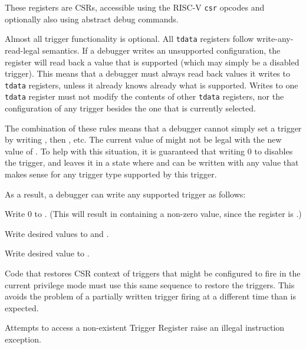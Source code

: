 These registers are CSRs, accessible using the RISC-V {\tt csr} opcodes and
optionally also using abstract debug commands.

Almost all trigger functionality is optional. All {\tt tdata} registers follow
write-any-read-legal semantics. If a debugger writes an unsupported
configuration, the register will read back a value that is supported (which may
simply be a disabled trigger).  This means that a debugger must always read
back values it writes to {\tt tdata} registers, unless it already knows already
what is
supported.  Writes to one {\tt tdata} register must not modify the contents of
other {\tt tdata} registers, nor the configuration of any trigger besides the
one that is currently selected.

The combination of these rules means that a debugger cannot simply set a
trigger by writing \RcsrTdataOne, then \RcsrTdataTwo, etc. The current value
of \RcsrTdataTwo might not be legal with the new value of \RcsrTdataOne. To
help with this situation, it is guaranteed that writing 0 to \RcsrTdataOne
disables the trigger, and leaves it in a state where \RcsrTdataTwo and
\RcsrTdataThree can be written with any value that makes sense for any
trigger type supported by this trigger.

\begin{steps}{As a result, a debugger can write any supported trigger as
follows:}
\item Write 0 to \RcsrTdataOne. (This will result in \RcsrTdataOne containing a
    non-zero value, since the register is \warl.)
\item Write desired values to \RcsrTdataTwo and \RcsrTdataThree.
\item Write desired value to \RcsrTdataOne.
\end{steps}

Code that restores CSR context of triggers that might be configured to fire in
the current privilege mode must use this same sequence to restore the triggers.
This avoids the problem of a partially written trigger firing at a different
time than is expected.

Attempts to access a non-existent Trigger Register raise an illegal instruction
exception.


